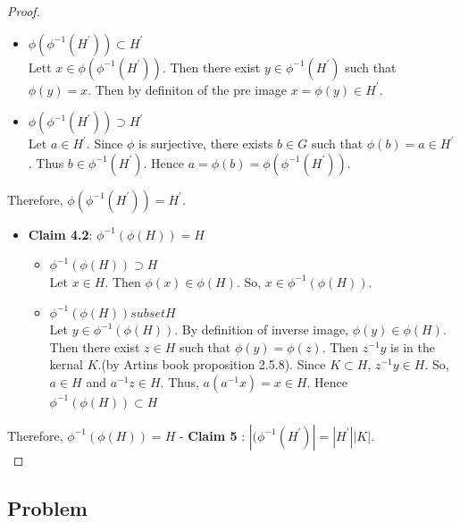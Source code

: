 \documentclass[
]{book}
\providecommand{\tightlist}{%
  \setlength{\itemsep}{0pt}\setlength{\parskip}{0pt}}
\theoremstyle{definition}
\theoremstyle{definition}
\theoremstyle{definition}
\theoremstyle{definition}
\theoremstyle{remark}
\begin{document}
\begin{proof}
\begin{itemize}
  \begin{itemize}
  \item
    \(\phi(\phi^{-1}(H^\prime))\subset H^\prime\)\\
    Lett \(x\in \phi(\phi^{-1}(H^\prime))\).
    Then there exist \(y\in\phi^{-1}(H^\prime)\) such that \(\phi(y)=x\). Then by definiton of the pre image \(x=\phi(y)\in H^\prime\).
  \item
    \(\phi(\phi^{-1}(H^\prime))\supset H^\prime\)\\
    Let \(a\in H^\prime\). Since \(\phi\) is surjective, there exists \(b\in G\) such that \(\phi(b)=a\in H^\prime\). Thus \(b\in \phi^{-1}(H^\prime)\). Hence \(a=\phi(b)=\phi(\phi^{-1}(H^\prime))\).
  \end{itemize}
\end{itemize}

Therefore, \(\phi(\phi^{-1}(H^\prime))=H^\prime\).

\begin{itemize}
\tightlist
\item
  \textbf{Claim 4.2}: \(\phi^{-1}(\phi(H))=H\)

  \begin{itemize}
  \tightlist
  \item
    \(\phi^{-1}(\phi(H))\supset H\)\\
    Let \(x\in H\). Then \(\phi(x) \in \phi(H)\). So, \(x\in \phi^{-1}(\phi(H))\).
  \item
    \(\phi^{-1}(\phi(H))subset H\)\\
    Let \(y\in \phi^{-1}(\phi(H))\). By definition of inverse image, \(\phi(y)\in \phi(H)\). Then there exist \(z\in H\) such that \(\phi(y)=\phi(z)\). Then \(z^{-1}y\) is in the kernal \(K\).(by Artins book proposition 2.5.8). Since \(K \subset H\), \(z^{-1}y\in H\). So, \(a\in H\) and \(a^{-1}z\in H\). Thus, \(a(a^{-1}x)=x\in H\). Hence \(\phi^{-1}(\phi(H))\subset H\)
  \end{itemize}
\end{itemize}

Therefore, \(\phi^{-1}(\phi(H))=H\)
- \textbf{Claim 5} : \(|(\phi^{-1} (H^\prime)| = |H^\prime||K|\).\\

\end{proof}

\hypertarget{problem-1}{%
\subsection{Problem}\label{problem-1}}
\end{document}
